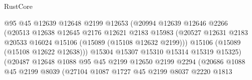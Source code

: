 \begin{lexlean}{RustCore}
\begin{coremodule}
                                      @95
                                      @45
                                      @12639
                                      @12648
                                      @2199
                                      @12653
                                      (@20994
                                        @12639
                                        @12646
                                        @2266
                                        (@20513
                                          @12638
                                          @12645
                                          @2176
                                          @12621
                                          @2183
                                          @15983
                                          (@20527
                                            @12631
                                            @2183
                                            @20533
                                            @16024
                                            @15106
                                            (@15089 (@15108 @12632 @2199)))
                                          @15106
                                          (@15089 (@15108 @12622 @12638)))
                                        @15304
                                        @15307
                                        @15310
                                        @15314
                                        @15319
                                        @15325)
                                      (@20487
                                        @12648
                                        @1088
                                        @95
                                        @45
                                        @2199
                                        @12650
                                        @2199
                                        @2294
                                        (@20686
                                          @1088
                                          @45
                                          @2199
                                          @8039
                                          (@27104
                                            @1087
                                            @1727
                                            @45
                                            @2199
                                            @8037
                                            @2220
                                            @1813

\end{coremodule}
\end{lexlean}
